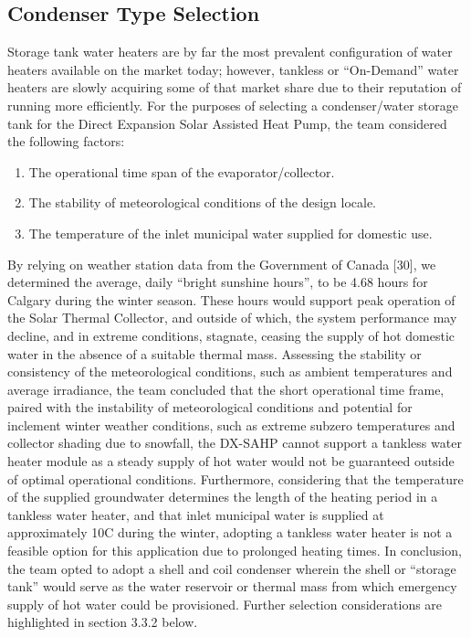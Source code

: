 \subsection{Condenser Type Selection}

Storage tank water heaters are by far the most prevalent configuration of water heaters available on the market today; however, tankless or “On-Demand” water heaters are slowly acquiring some of that market share due to their reputation of running more efficiently. For the purposes of selecting a condenser/water storage tank for the Direct Expansion Solar Assisted Heat Pump, the team considered the following factors:

\medskip
\begin{enumerate}[itemsep=3mm, parsep=-1mm, label=\roman*.]
    \item The operational time span of the evaporator/collector.
    \item The stability of meteorological conditions of the design locale.
    \item The temperature of the inlet municipal water supplied for domestic use.
\end{enumerate}

\medskip
By relying on weather station data from the Government of Canada [30], we determined the average, daily “bright sunshine hours”, to be 4.68 hours for Calgary during the winter season. These hours would support peak operation of the Solar Thermal Collector, and outside of which, the system performance may decline, and in extreme conditions, stagnate, ceasing the supply of hot domestic water in the absence of a suitable thermal mass. Assessing the stability or consistency of the meteorological conditions, such as ambient temperatures and average irradiance, the team concluded that the short operational time frame, paired with the instability of meteorological conditions and potential for inclement winter weather conditions, such as extreme subzero temperatures and collector shading due to snowfall, the DX-SAHP cannot support a tankless water heater module as a steady supply of hot water would not be guaranteed outside of optimal operational conditions. Furthermore, considering that the temperature of the supplied groundwater determines the length of the heating period in a tankless water heater, and that inlet municipal water is supplied at approximately 10\textdegree C during the winter, adopting a tankless water heater is not a feasible option for this application due to prolonged heating times. In conclusion, the team opted to adopt a shell and coil condenser wherein the shell or “storage tank” would serve as the water reservoir or thermal mass from which emergency supply of hot water could be provisioned. Further selection considerations are highlighted in section 3.3.2 below.

